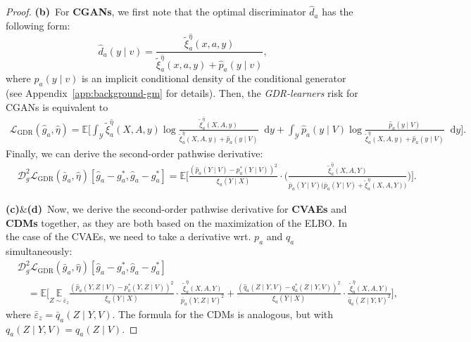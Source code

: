 \documentclass[dvipsnames]{article} %
\newcommand*\diff{\mathop{}\!\mathrm{d}}
\newcommand{\GDRlearners}{\emph{GDR-learners}\xspace}
\begin{document}
\begin{proof}
    \textbf{(b)}~For \textbf{CGANs}, we first note that the optimal discriminator $\hat{d}_a$ has the following form:
    \begingroup\makeatletter\def\f@size{9}\check@mathfonts
    \begin{equation}
        \hat{d}_a(y \mid v) = \frac{\tilde{\xi}^{\hat{\eta}}_a(x, a, y)}{\tilde{\xi}^{\hat{\eta}}_a(x, a, y) + \hat{p}_a(y \mid v)},
    \end{equation}
    \endgroup
    where $\hat{p}_a(y \mid v)$ is an implicit conditional density of the conditional generator (see Appendix~\ref{app:background-gm} for details). Then, the \GDRlearners risk for CGANs is equivalent to
    \begingroup\makeatletter\def\f@size{8}\check@mathfonts
    \begin{align}
        \mathcal{L}_\text{{GDR}}(\hat{g}_a, \hat{\eta}) = \mathbb{E} \bigg[\int_{\mathcal{Y}}\tilde{\xi}^{\hat{\eta}}_a(X, A, y)  \log \frac{\tilde{\xi}^{\hat{\eta}}_a(X, A, y)}{\tilde{\xi}^{\hat{\eta}}_a(X, A, y) + \hat{p}_a(y \mid V)} \diff y  + \int_{\mathcal{Y}}\hat{p}_a(y \mid V) \log \frac{\hat{p}_a(y \mid V)}{\tilde{\xi}^{\hat{\eta}}_a(X, A, y) + \hat{p}_a(y \mid V)} \diff y \bigg].
    \end{align}
    \endgroup
    Finally, we can derive the second-order pathwise derivative:
    \begingroup\makeatletter\def\f@size{8}\check@mathfonts
    \begin{align}
        & \mathcal{D}_g^2\mathcal{L}_\text{{GDR}}(\bar{g}_a, \hat{\eta})[\hat{g}_a - g_a^*, \hat{g}_a - g_a^*]
        = \mathbb{E}\Bigg[\frac{(\hat{p}_a(Y \mid V) - p_a^*(Y \mid V))^2}{\xi_a(Y \mid X)} \cdot \bigg(\frac{\tilde{\xi}^{\hat{\eta}}_a(X, A, Y)}{\bar{p}_a(Y \mid V) \big(\bar{p}_a(Y \mid V) + \tilde{\xi}^{\hat{\eta}}_a(X, A, Y)\big) } \bigg) \Bigg].
    \end{align}
    \endgroup

    \textbf{(c)}\&\textbf{(d)}~Now, we derive the second-order pathwise derivative for \textbf{CVAEs} and \textbf{CDMs} together, as they are both based on the maximization of the ELBO. In the case of the CVAEs, we need to take a derivative wrt. $p_a$ and $q_a$ simultaneously: 
    \begingroup\makeatletter\def\f@size{8}\check@mathfonts
    \begin{align}
        & \mathcal{D}_g^2\mathcal{L}_\text{{GDR}}(\bar{g}_a, \hat{\eta})[\hat{g}_a - g_a^*, \hat{g}_a - g_a^*] \\
        & \quad = \mathbb{E}\Bigg[ \underset{Z \sim \bar{\varepsilon}_z }{\mathbb{E}} \frac{(\hat{p}_a(Y, Z \mid V) - p_a^*(Y, Z \mid V))^2}{\xi_a(Y \mid X)} \cdot \frac{\tilde{\xi}^{\hat{\eta}}_a(X, A, Y) }{\bar{p}_a(Y, Z \mid V)^2 } + \frac{(\hat{q}_a(Z \mid Y, V) - q_a^*(Z \mid Y, V))^2}{\xi_a(Y \mid X)} \cdot \frac{\tilde{\xi}^{\hat{\eta}}_a(X, A, Y) }{\bar{q}_a(Z \mid Y, V)^2 }  \Bigg], \nonumber
    \end{align}
    \endgroup
    where $\bar{\varepsilon}_z = \bar{q}_a(Z \mid Y, V)$. The formula for the CDMs is analogous, but with $q_a(Z \mid Y, V) = q_a(Z \mid V)$.


\end{proof}
\end{document}
